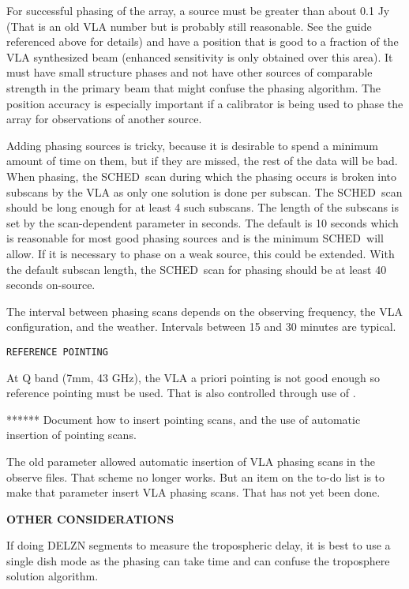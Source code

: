 \documentclass{report}
\newcommand{\schedb}{{\sc SCHED~}}
\begin{document}
For successful phasing of the array, a source must be greater than
about 0.1 Jy (That is an old VLA number but is probably still
reasonable.  See the guide referenced above for details) and have a
position that is good to a fraction of the VLA synthesized beam
(enhanced sensitivity is only obtained over this area).  It must have
small structure phases and not have other sources of comparable
strength in the primary beam that might confuse the phasing algorithm.
The position accuracy is especially important if a calibrator is being
used to phase the array for observations of another source.  

Adding phasing sources is tricky, because it is desirable to spend a
minimum amount of time on them, but if they are missed, the rest of
the data will be bad.  When phasing, the \schedb scan during which the
phasing occurs is broken into subscans by the VLA as only one solution
is done per subscan.  The \schedb scan should be long enough for at
least 4 such subscans.  The length of the subscans is set by the
scan-dependent parameter  in
seconds.  The default is 10 seconds which is reasonable for most good
phasing sources and is the minimum \schedb will allow.  If it is
necessary to phase on a weak source, this could be extended.  With the
default subscan length, the \schedb scan for phasing should be at
least 40 seconds on-source.

The interval between phasing scans depends on the observing frequency,
the VLA configuration, and the weather.  Intervals between 15 and 30 minutes
are typical. %

{\tt REFERENCE POINTING}

At Q band (7mm, 43 GHz), the VLA a priori pointing is not good enough so
reference pointing must be used.  That is also controlled through use
of .

******  Document how to insert pointing scans, and the use of 
automatic insertion of pointing scans.

The old parameter  allowed automatic
insertion of VLA phasing scans in the observe files.  That scheme no 
longer works.  But an item on the to-do list is to make that parameter
insert VLA phasing scans.  That has not yet been done.


{\bf OTHER CONSIDERATIONS}

If doing DELZN segments to measure the tropospheric delay, it is best
to use a single dish mode as the phasing can take time and can confuse 
the troposphere solution algorithm.
\end{document}
